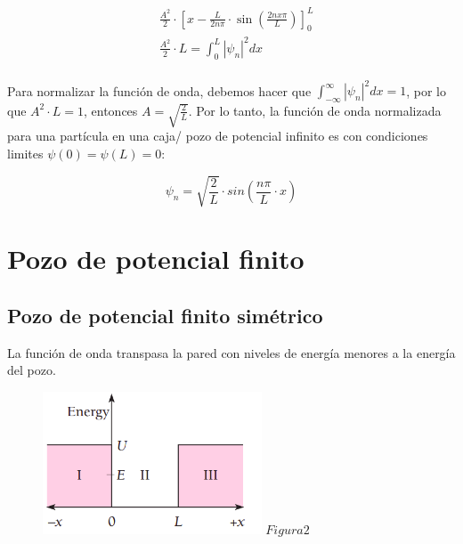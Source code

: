 \documentclass[a4paper]{article}
\begin{document}
        \saltoPag

        \vspace{-1mm}

        \begin{align*}
            &\frac{A^{2}}{2} \cdot \left[ x - \frac{L}{2n\pi} \cdot \sin(\frac{2nx\pi}{L}) \right]_{0}^{L} \\
            &\frac{A^{2}}{2} \cdot L = \int_{0}^{L} \left| \psi_n \right|^{2} dx \\
        \end{align*}

        \indent Para normalizar la función de onda, debemos hacer que $\int_{-\infty}^{\infty} \left| \psi_n \right|^{2} dx = 1$, por lo que $A^{2} \cdot L = 1$, entonces $A = \sqrt{\frac{2}{L}}$. Por lo tanto, la función de onda normalizada para una partícula en una caja/ pozo de potencial infinito es con condiciones limites $\psi(0) = \psi(L) = 0$:

        \begin{equation}
            \psi_n = \sqrt{\frac{2}{L}} \cdot sin(\frac{n\pi}{L} \cdot x)
        \end{equation}
    

        \section{Pozo de potencial finito}

            \subsection{Pozo de potencial finito simétrico}

            \indent La función de onda transpasa la pared con niveles de energía menores a la energía del pozo.

            \begin{figure}[h!]
                \centering
                \includegraphics[width=6.5cm]{../../imagenes/pozo_potencial_finito.png}
                \vspace{-0.5mm}
                \textbf{$Figura 2$}
            \end{figure}
\end{document}

